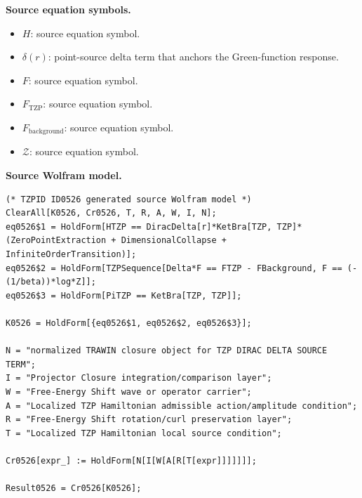 \begin{minipage}[t]{0.49\linewidth}
\begingroup
\small
\raggedright
\textbf{Source equation symbols.}\par
\begin{itemize}[leftmargin=1.35em,itemsep=1pt,topsep=1pt,parsep=0pt]
    \item $H$: source equation symbol.
    \item $\delta(r)$: point-source delta term that anchors the Green-function response.
    \item $F$: source equation symbol.
    \item $F_{\mathrm{TZP}}$: source equation symbol.
    \item $F_{\mathrm{background}}$: source equation symbol.
    \item $\mathcal{Z}$: source equation symbol.
\end{itemize}
\endgroup
\end{minipage}\hfill
\begin{minipage}[t]{0.47\linewidth}
\begingroup
\scriptsize
\raggedright
\textbf{Source Wolfram model.}\par
\begin{Verbatim}[fontsize=\tiny,breaklines=true,breakanywhere=true]
(* TZPID ID0526 generated source Wolfram model *)
ClearAll[K0526, Cr0526, T, R, A, W, I, N];
eq0526$1 = HoldForm[HTZP == DiracDelta[r]*KetBra[TZP, TZP]*(ZeroPointExtraction + DimensionalCollapse + InfiniteOrderTransition)];
eq0526$2 = HoldForm[TZPSequence[Delta*F == FTZP - FBackground, F == (-(1/beta))*log*Z]];
eq0526$3 = HoldForm[PiTZP == KetBra[TZP, TZP]];

K0526 = HoldForm[{eq0526$1, eq0526$2, eq0526$3}];

N = "normalized TRAWIN closure object for TZP DIRAC DELTA SOURCE TERM";
I = "Projector Closure integration/comparison layer";
W = "Free-Energy Shift wave or operator carrier";
A = "Localized TZP Hamiltonian admissible action/amplitude condition";
R = "Free-Energy Shift rotation/curl preservation layer";
T = "Localized TZP Hamiltonian local source condition";

Cr0526[expr_] := HoldForm[N[I[W[A[R[T[expr]]]]]]];

Result0526 = Cr0526[K0526];
\end{Verbatim}
\endgroup
\end{minipage}

